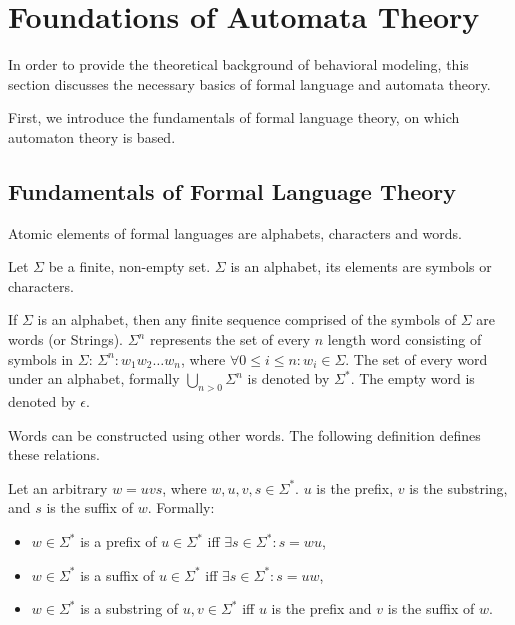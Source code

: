 \section{Foundations of Automata Theory} \label{sec_backgrmodeling}






In order to provide the theoretical background of behavioral modeling, this section discusses the necessary basics of formal language and automata theory.


First, we introduce the fundamentals of formal language theory, on which automaton theory is based. 

\subsection{Fundamentals of Formal Language Theory}
Atomic elements of formal languages are alphabets, characters and words.

\begin{definition}[Alphabet]
	Let $\Sigma$ be a finite, non-empty set. $\Sigma$ is an alphabet, its elements are symbols or characters.
\end{definition}

\begin{definition}[Word]
	If $\Sigma$ is an alphabet, then any finite sequence comprised of the symbols of $\Sigma$ are words (or Strings). $\Sigma^{n}$ represents the set of every $n$ length word consisting of symbols in $\Sigma$: $\Sigma^{n}: w_1w_2\ldots w_n$, where $\forall 0 \leq i \leq n: w_i \in \Sigma$. The set of every word under an alphabet, formally $\bigcup\limits_{n>0}^{} \Sigma^{n}$ is denoted by $\Sigma^{*}$. The empty word is denoted by $\epsilon$.
\end{definition}

Words can be constructed using other words. The following definition defines these relations.

\begin{definition}
	Let an arbitrary $w = uvs$, where $w, u, v, s\in\Sigma^*$. $u$ is the prefix, $v$ is the substring, and $s$ is the suffix of $w$. Formally:
	\begin{itemize}
		\item $w\in\Sigma^*$ is a prefix of $u\in\Sigma^*$ iff $\exists s\in\Sigma^*: s=wu$,
		\item $w\in\Sigma^*$ is a suffix of $u\in\Sigma^*$ iff $\exists s\in\Sigma^*: s=uw$,
		\item $w\in\Sigma^*$ is a substring of $u, v\in\Sigma^*$ iff $u$ is the prefix and $v$ is the suffix of $w$.
	\end{itemize}
\end{definition}

